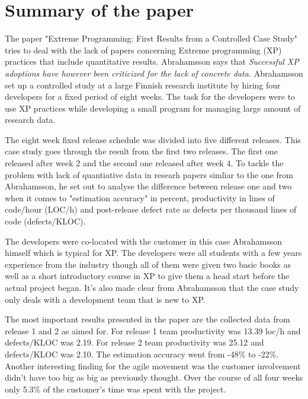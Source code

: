 \newpage
\section{Summary of the paper}
The paper "Extreme Programming: First Results from a Controlled Case Study"
\cite{abrahamsson2003} tries to deal with the lack of papers concerning Extreme
programming (XP) practices that include quantitative results. Abrahamsson says that
{\em Successful XP adoptions have however been criticized for the lack of
concrete data.} Abrahamsson set up a controlled study at a large Finnish
research institute by hiring four developers for a fixed period of eight weeks.
The task for the developers were to use XP practices while developing a small
program for managing large amount of research data.

The eight week fixed release schedule was divided into five different releases.
This case study goes through the result from the first two releases. The first
one released after week 2 and the second one released after week 4. To tackle
the problem with lack of quantiative data in researh papers simliar to the one
from Abrahamsson, he set out to analyse the difference between release one and
two when it comes to "estimation accuracy" in percent, productivity in lines of
code/hour (LOC/h) and post-release defect rate as defects per thousand lines of
code (defects/KLOC).

The developers were co-located with the customer in this case Abrahamsson
himself which is typical for XP. The developers were all students with a few
years experience from the industry though all of them were given two basic
books as well as a short introductory course in XP to give them a head start
before the actual project began. It's also made clear from Abrahamsson that
the case study only deals with a development team that is new to XP.

The most important results presented in the paper are the collected data from
release 1 and 2 as aimed for. For release 1 team productivity was 13.39
loc/h and defects/KLOC was 2.19. For release 2 team productivity was 25.12 and
defects/KLOC was 2.10. The estimation accuracy went from -48\% to
-22\%. Another interesting finding for the agile movement was the customer
involvement didn't have too big as big as previously thought. Over the course
of all four weeks only 5.3\% of the customer's time was spent with the project.
